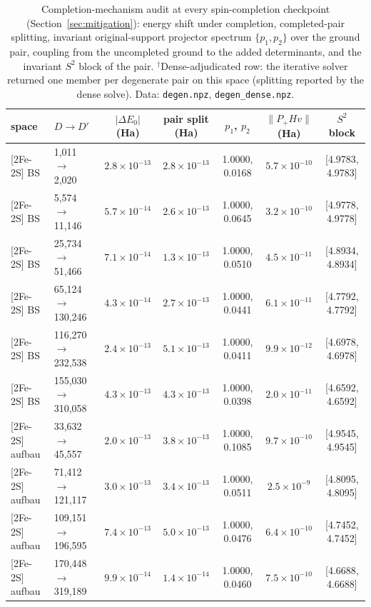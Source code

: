 \documentclass[11pt]{article}
\begin{document}
\begin{table}[t]
\centering
\caption{Completion-mechanism audit at every spin-completion checkpoint (Section~\ref{sec:mitigation}): energy shift under completion, completed-pair splitting, invariant original-support projector spectrum $\{p_1,p_2\}$ over the ground pair, coupling from the uncompleted ground to the added determinants, and the invariant $S^2$ block of the pair. $^\dagger$Dense-adjudicated row: the iterative solver returned one member per degenerate pair on this space (splitting reported by the dense solve). Data: \texttt{degen.npz}, \texttt{degen\_dense.npz}.}
\label{tab:mech}
\small
\setlength{\tabcolsep}{2.5pt}
\begin{tabular}{llccccc}
\hline
space & $D \to D'$ & $|\Delta E_0|$ (Ha) & pair split (Ha) & $p_1$, $p_2$ & $\|P_+ H v\|$ (Ha) & $S^2$ block \\
\hline
{[2Fe-2S]} BS & 1,011 $\to$ 2,020 & $2.8\times10^{-13}$ & $2.8\times10^{-13}$ & 1.0000, 0.0168 & $5.7\times10^{-10}$ & [4.9783, 4.9783] \\
{[2Fe-2S]} BS & 5,574 $\to$ 11,146 & $5.7\times10^{-14}$ & $2.6\times10^{-13}$ & 1.0000, 0.0645 & $3.2\times10^{-10}$ & [4.9778, 4.9778] \\
{[2Fe-2S]} BS & 25,734 $\to$ 51,466 & $7.1\times10^{-14}$ & $1.3\times10^{-13}$ & 1.0000, 0.0510 & $4.5\times10^{-11}$ & [4.8934, 4.8934] \\
{[2Fe-2S]} BS & 65,124 $\to$ 130,246 & $4.3\times10^{-14}$ & $2.7\times10^{-13}$ & 1.0000, 0.0441 & $6.1\times10^{-11}$ & [4.7792, 4.7792] \\
{[2Fe-2S]} BS & 116,270 $\to$ 232,538 & $2.4\times10^{-13}$ & $5.1\times10^{-13}$ & 1.0000, 0.0411 & $9.9\times10^{-12}$ & [4.6978, 4.6978] \\
{[2Fe-2S]} BS & 155,030 $\to$ 310,058 & $4.3\times10^{-13}$ & $4.3\times10^{-13}$ & 1.0000, 0.0398 & $2.0\times10^{-11}$ & [4.6592, 4.6592] \\
{[2Fe-2S]} aufbau & 33,632 $\to$ 45,557 & $2.0\times10^{-13}$ & $3.8\times10^{-13}$ & 1.0000, 0.1085 & $9.7\times10^{-10}$ & [4.9545, 4.9545] \\
{[2Fe-2S]} aufbau & 71,412 $\to$ 121,117 & $3.0\times10^{-13}$ & $3.4\times10^{-13}$ & 1.0000, 0.0511 & $2.5\times10^{-9}$ & [4.8095, 4.8095] \\
{[2Fe-2S]} aufbau & 109,151 $\to$ 196,595 & $7.4\times10^{-13}$ & $5.0\times10^{-13}$ & 1.0000, 0.0476 & $6.4\times10^{-10}$ & [4.7452, 4.7452] \\
{[2Fe-2S]} aufbau & 170,448 $\to$ 319,189 & $9.9\times10^{-14}$ & $1.4\times10^{-14}$ & 1.0000, 0.0460 & $7.5\times10^{-10}$ & [4.6688, 4.6688] \\

\end{tabular}
\end{table}
\end{document}
